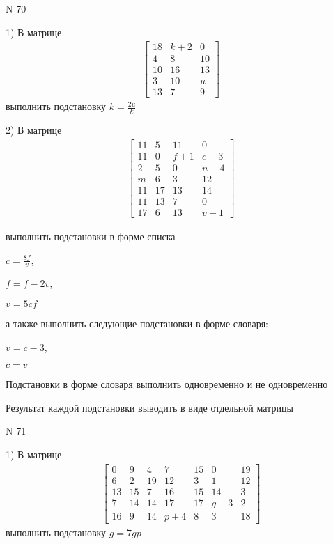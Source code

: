 \documentclass[11pt]{report}
\begin{document}
\newpage
N 70


    1) В матрице
\begin{align*}
\left[\begin{matrix}18 & k + 2 & 0\\4 & 8 & 10\\10 & 16 & 13\\3 & 10 & u\\13 & 7 & 9\end{matrix}\right]
\end{align*}
выполнить подстановку $k=\frac{2 u}{k}$


    2) В матрице
\begin{align*}
\left[\begin{matrix}11 & 5 & 11 & 0\\11 & 0 & f + 1 & c - 3\\2 & 5 & 0 & n - 4\\m & 6 & 3 & 12\\11 & 17 & 13 & 14\\11 & 13 & 7 & 0\\17 & 6 & 13 & v - 1\end{matrix}\right]
\end{align*}

выполнить подстановки в форме списка

$c=\frac{8 f}{v}$,

$f=f - 2 v$,

$v=5 c f$

а также выполнить следующие подстановки в форме словаря:

$v=c - 3$,

$c=v$


    Подстановки в форме словаря выполнить одновременно и не одновременно


    Результат каждой подстановки выводить в виде отдельной матрицы

\newpage
N 71


    1) В матрице
\begin{align*}
\left[\begin{matrix}0 & 9 & 4 & 7 & 15 & 0 & 19\\6 & 2 & 19 & 12 & 3 & 1 & 12\\13 & 15 & 7 & 16 & 15 & 14 & 3\\7 & 14 & 14 & 17 & 17 & g - 3 & 2\\16 & 9 & 14 & p + 4 & 8 & 3 & 18\end{matrix}\right]
\end{align*}
выполнить подстановку $g=7 g p$
\end{document}
